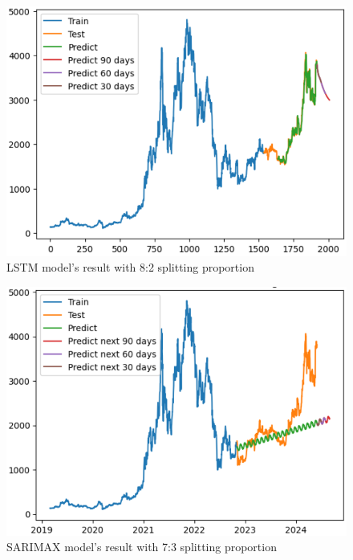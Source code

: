 \documentclass{ieeeojies}
\begin{document}
\begin{figure}[H]
	\centering
	\begin{minipage}{0.8\linewidth}
		\centering
		\includegraphics[width=\linewidth]{bibliography/Images/LSTM_ETH_82.PNG}
		\caption{LSTM model's result with 8:2 splitting proportion}
	\end{minipage}
\end{figure}
\begin{figure}[H]
	\centering
	\begin{minipage}{0.8\linewidth}
		\centering
		\includegraphics[width=\linewidth]{bibliography/Images/SARIMAX_ETH_73.PNG}
		\caption{SARIMAX model's result with 7:3 splitting proportion}
	\end{minipage}
\end{figure}
\end{document}
